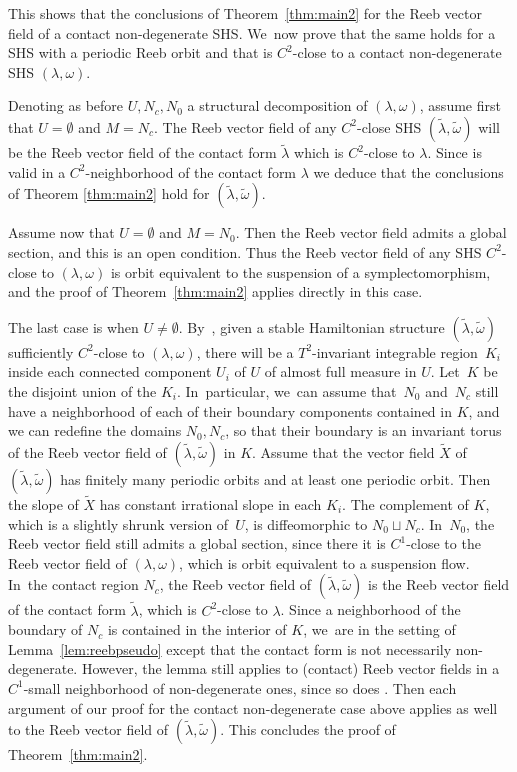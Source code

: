 \documentclass[10pt]{amsart}
\theoremstyle{definition}
\begin{document}
This shows that the conclusions of Theorem~\ref{thm:main2} for the Reeb vector field of a contact non-degenerate SHS. We~now prove that the same holds for a SHS with a periodic Reeb orbit and that is $C^2$-close to a contact non-degenerate SHS $(\lambda,\omega)$.

Denoting as before $U,N_c, N_0$ a structural decomposition of $(\lambda,\omega)$, assume first that $U=\emptyset$ and $M=N_c$. The Reeb vector field of any $C^2$-close SHS $(\widetilde \lambda, \widetilde \omega)$ will be the Reeb vector field of the contact form $\widetilde \lambda$ which is $C^2$-close to $\lambda$. Since \cite[Th.\,1.2]{CDR} is valid in a $C^2$-neighborhood of the contact form $\lambda$ we deduce that the conclusions of Theorem \ref{thm:main2} hold for $(\widetilde \lambda, \widetilde \omega)$.

Assume now that $U=\emptyset$ and $M=N_0$. Then the Reeb vector field admits a global section, and this is an open condition. Thus the Reeb vector field of any SHS $C^2$-close to $(\lambda,\omega)$ is orbit equivalent to the suspension of a symplectomorphism, and the proof of Theorem~\ref{thm:main2} applies directly in this case.

The last case is when $U\neq \emptyset$. By~\cite[Th.\,3.7]{CV1}, given a stable Hamiltonian structure $(\widetilde \lambda, \widetilde \omega)$ sufficiently $C^2$-close to $(\lambda,\omega)$, there will be a $T^2$-invariant integrable region~$K_i$ inside each connected component $U_i$ of $U$ of almost full measure in $U$. Let~$K$ be the disjoint union of the $K_i$. In~particular, we~can assume that~$N_0$ and~$N_c$ still have a neighborhood of each of their boundary components contained in $K$, and we can redefine the domains $N_0, N_c$, so that their boundary is an invariant torus of the Reeb vector field of $(\widetilde \lambda, \widetilde \omega)$ in $K$. Assume that the vector field $\widetilde X$ of $(\widetilde \lambda, \widetilde \omega)$ has finitely many periodic orbits and at least one periodic orbit. Then the slope of $\widetilde X$ has constant irrational slope in each $K_i$. The complement of $K$, which is a slightly shrunk version of~$U$, is diffeomorphic to $N_0\sqcup N_c$. In~$N_0$, the Reeb vector field still admits a global section, since there it is $C^1$-close to the Reeb vector field of $(\lambda,\omega)$, which is orbit equivalent to a suspension flow. In~the contact region $N_c$, the Reeb vector field of $(\widetilde \lambda, \widetilde \omega)$ is the Reeb vector field of the contact form $\widetilde \lambda$, which is $C^2$-close to $\lambda$. Since a neighborhood of the boundary of $N_c$ is contained in the interior of $K$, we~are in the setting of Lemma~\ref{lem:reebpseudo} except that the contact form is not necessarily non-degenerate. However, the lemma still applies to (contact) Reeb vector fields in a $C^1$-small neighborhood of non-degenerate ones, since so does \cite[Th.\,1.2]{CDR}. Then each argument of our proof for the contact non-degenerate case above applies as well to the Reeb vector field of $(\widetilde \lambda, \widetilde \omega)$. This concludes the proof of Theorem~\ref{thm:main2}.
\end{document}
